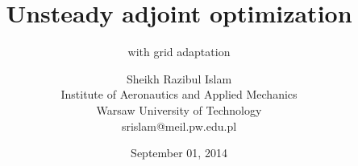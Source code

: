 \title[]
  {Unsteady adjoint optimization}

\subtitle{with grid adaptation}

\author[Part 2]{%
\vspace{5 mm}
  Sheikh Razibul Islam\\
  \vspace{0 mm}
  Institute of Aeronautics and Applied Mechanics\\
  Warsaw University of Technology\\ 
  \vspace{3 mm}
  {srislam}@meil.pw.edu.pl}
  

\date{September 01, 2014}


\frame{\titlepage}
